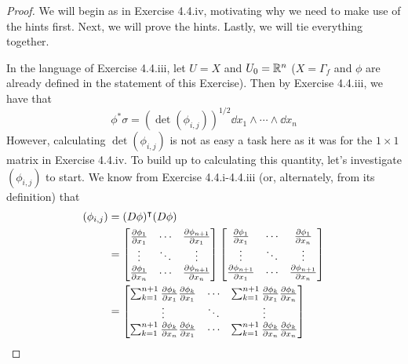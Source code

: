 \documentclass[../psets.tex]{subfiles}
\begin{document}
\begin{enumerate}[label={\textbf{4.4.\roman*.}}]
\begin{proof}
        We will begin as in Exercise 4.4.iv, motivating why we need to make use of the hints first. Next, we will prove the hints. Lastly, we will tie everything together.\par\smallskip
        In the language of Exercise 4.4.iii, let $U=X$ and $U_0=\mathbb{R}^n$ ($X=\Gamma_f$ and $\phi$ are already defined in the statement of this Exercise). Then by Exercise 4.4.iii, we have that
        \begin{equation*}
            \phi^*\sigma = (\det(\phi_{i,j}))^{1/2}\dd{x_1}\wedge\cdots\wedge\dd{x_n}
        \end{equation*}
        However, calculating $\det(\phi_{i,j})$ is not as easy a task here as it was for the $1\times 1$ matrix in Exercise 4.4.iv. To build up to calculating this quantity, let's investigate $(\phi_{i,j})$ to start. We know from Exercise 4.4.i-4.4.iii (or, alternately, from its definition) that
        \begin{align*}
            (\phi_{i,j}) &= (D\phi)^\intercal(D\phi)\\
            &=
            \begin{bmatrix}
                \pdv{\phi_1}{x_1} & \cdots & \pdv{\phi_{n+1}}{x_1}\\
                \vdots & \ddots & \vdots\\
                \pdv{\phi_1}{x_n} & \cdots & \pdv{\phi_{n+1}}{x_n}\\
            \end{bmatrix}
            \begin{bmatrix}
                \pdv{\phi_1}{x_1} & \cdots & \pdv{\phi_1}{x_n}\\
                \vdots & \ddots & \vdots\\
                \pdv{\phi_{n+1}}{x_1} & \cdots & \pdv{\phi_{n+1}}{x_n}\\
            \end{bmatrix}\\
            &=
            \begin{bmatrix}
                \sum_{k=1}^{n+1}\pdv{\phi_k}{x_1}\pdv{\phi_k}{x_1} & \cdots & \sum_{k=1}^{n+1}\pdv{\phi_k}{x_1}\pdv{\phi_k}{x_n}\\
                \vdots & \ddots & \vdots\\
                \sum_{k=1}^{n+1}\pdv{\phi_k}{x_n}\pdv{\phi_k}{x_1} & \cdots & \sum_{k=1}^{n+1}\pdv{\phi_k}{x_n}\pdv{\phi_k}{x_n}\\
            \end{bmatrix}
        \end{align*}

\end{proof}
\end{enumerate}
\end{document}
